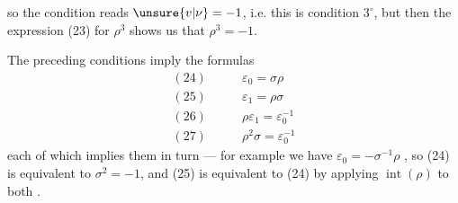 
so the condition reads $\unsure{v|\nu}=-1$, i.e. this is condition $3^\circ$, but then the expression (23) for $\rho^3$ shows us that $\rho^3=-1$.

\uline{} The preceding conditions imply the formulas
\[
\begin{aligned}
(24)\qquad &\varepsilon_0=\sigma\rho\\
(25)\qquad &\varepsilon_1=\rho\sigma\\
(26)\qquad &\rho\varepsilon_1=\varepsilon_0^{-1}\\
(27)\qquad &\rho^2\sigma=\varepsilon_0^{-1}
\end{aligned}
\]
each of which  implies them in turn
--- for example we have $\varepsilon_0=-\sigma^{-1}\rho$ , so (24) is equivalent to  $\sigma^2=-1$, and (25) is equivalent to (24) by applying $\operatorname{int}(\rho)$ to both .

